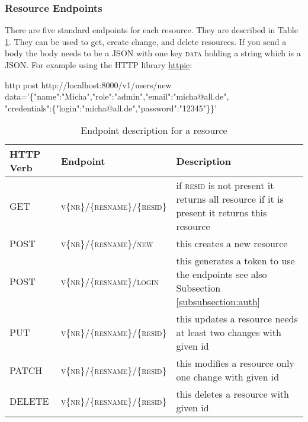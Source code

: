 \subsubsection{Resource Endpoints}
There are five standard endpoints for each resource. They are described in Table \ref{table:endpoints}. They can be used to get, create change, and delete resources. If you send a body the body needs to be a JSON with one key \textsc{data} holding a string which is a JSON. For example using the HTTP library \href{https://httpie.org/}{httpie}:\\
\begin{tcolorbox}
http post http://localhost:8000/v1/users/new\\
data='\{"name":"Micha","role":"admin","email":"micha@all.de",\\"credentials":\{"login":"micha@all.de","password":"12345"\}\}'
\end{tcolorbox}
\begin{table}
	\begin{tabular}{ p{2cm}| p{4cm} | p{5cm} }
		HTTP Verb & Endpoint & Description \\\hline\hline
		GET & \textsc{v\{nr\}/\{resname\}/\{resid\}} & if \textsc{resid} is not present it returns all resource if it is present it returns this resource \\\hline
		POST & \textsc{v\{nr\}/\{resname\}/new}  & this creates a new resource  \\	\hline
		POST & \textsc{v\{nr\}/\{resname\}/login}  & this generates a token to use the endpoints see also Subsection \ref{subsubsection:auth} \\	\hline
		PUT &\textsc{v\{nr\}/\{resname\}/\{resid\}} & this updates a resource needs at least two changes with given id \\\hline
		PATCH & \textsc{v\{nr\}/\{resname\}/\{resid\}}  & this modifies a resource only one change with given id\\\hline
		DELETE & \textsc{v\{nr\}/\{resname\}/\{resid\}} &  this deletes a resource with given id \\
	\end{tabular}
	\caption{Endpoint description for a resource}\label{table:endpoints}
\end{table}
